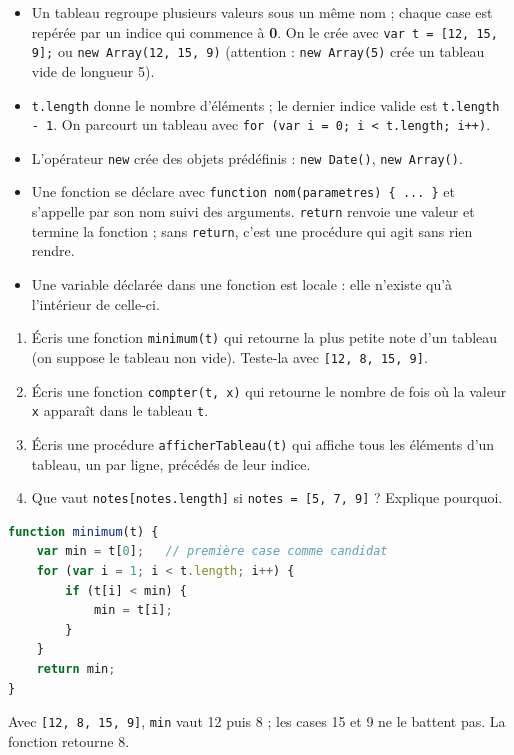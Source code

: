 \documentclass[11pt]{article}
\newcommand{\cle}[1]{{\popxbold\color{popdark}#1}}
\begin{document}
\begin{aretenir}
\begin{itemize}
  \item Un \cle{tableau} regroupe plusieurs valeurs sous un même nom ; chaque case est repérée par un \cle{indice} qui commence à \textbf{0}. On le crée avec \texttt{var t = [12, 15, 9];} ou \texttt{new Array(12, 15, 9)} (attention : \texttt{new Array(5)} crée un tableau vide de longueur 5).
  \item \texttt{t.length} donne le nombre d'éléments ; le dernier indice valide est \texttt{t.length - 1}. On parcourt un tableau avec \texttt{for (var i = 0; i < t.length; i++)}.
  \item L'opérateur \texttt{new} crée des objets prédéfinis : \texttt{new Date()}, \texttt{new Array()}.
  \item Une \cle{fonction} se déclare avec \texttt{function nom(parametres) \{ ... \}} et s'appelle par son nom suivi des arguments. \texttt{return} renvoie une valeur et termine la fonction ; sans \texttt{return}, c'est une procédure qui agit sans rien rendre.
  \item Une variable déclarée dans une fonction est \cle{locale} : elle n'existe qu'à l'intérieur de celle-ci.
\end{itemize}
\end{aretenir}

\begin{exercice}
\begin{enumerate}
  \item Écris une fonction \texttt{minimum(t)} qui retourne la plus petite note d'un tableau (on suppose le tableau non vide). Teste-la avec \texttt{[12, 8, 15, 9]}.
  \item Écris une fonction \texttt{compter(t, x)} qui retourne le nombre de fois où la valeur \texttt{x} apparaît dans le tableau \texttt{t}.
  \item Écris une procédure \texttt{afficherTableau(t)} qui affiche tous les éléments d'un tableau, un par ligne, précédés de leur indice.
  \item Que vaut \texttt{notes[notes.length]} si \texttt{notes = [5, 7, 9]} ? Explique pourquoi.
\end{enumerate}
\end{exercice}

\begin{corrige}[Exercice n 1]
\begin{lstlisting}[language=JavaScript]
function minimum(t) {
    var min = t[0];   // première case comme candidat
    for (var i = 1; i < t.length; i++) {
        if (t[i] < min) {
            min = t[i];
        }
    }
    return min;
}
\end{lstlisting}
Avec \texttt{[12, 8, 15, 9]}, \texttt{min} vaut 12 puis 8 ; les cases 15 et 9 ne le battent pas. La fonction retourne 8.
\end{corrige}
\end{document}

